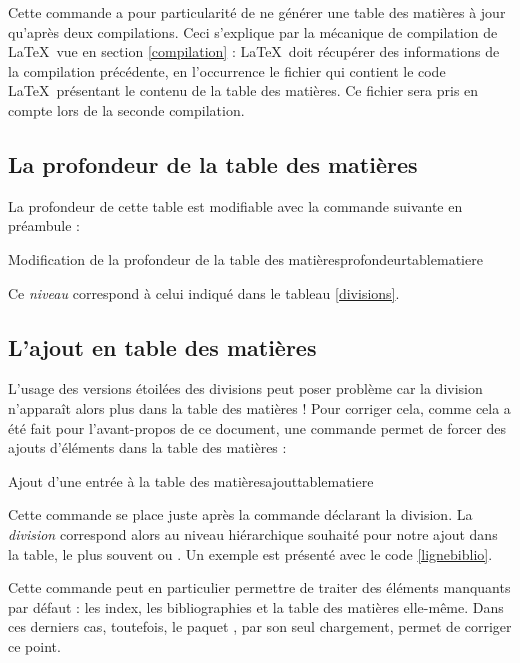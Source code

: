 Cette commande a pour particularité de ne générer une table des matières à jour qu'après deux compilations. Ceci s'explique par la mécanique de compilation de \LaTeX\ vue en section \ref{compilation} : \LaTeX\ doit récupérer des informations de la compilation précédente, en l'occurrence le fichier  qui contient le code \LaTeX\ présentant le contenu de la table des matières. Ce fichier sera pris en compte lors de la seconde compilation. 


\subsection{La profondeur de la table des matières}

La profondeur de cette table est modifiable avec la commande suivante en préambule :

\begin{codesimple}{Modification de la profondeur de la table des matières}{profondeurtablematiere}
\setcounter{tocdepth}{§oc£¤niveau§fc}
\end{codesimple}

Ce \textit{niveau} correspond à celui indiqué dans le tableau \ref{divisions}.


\subsection{L'ajout en table des matières} \label{tocajout}

L'usage des versions étoilées des divisions peut poser problème car la division n'apparaît alors plus dans la table des matières ! Pour corriger cela, comme cela a été fait pour l'avant-propos de ce document, une commande permet de forcer des ajouts d'éléments dans la table des matières :

\begin{codesimple}{Ajout d'une entrée à la table des matières}{ajouttablematiere}
\end{codesimple}

Cette commande se place juste après la commande déclarant la division. La \emph{division} correspond alors au niveau hiérarchique  souhaité pour notre ajout dans la table, le plus souvent  ou . Un exemple est présenté avec le code \ref{lignebiblio}.

Cette commande peut en particulier permettre de traiter des éléments manquants par défaut : les index, les bibliographies et la table des matières elle-même. Dans ces derniers cas, toutefois, le paquet , par son seul chargement, permet de corriger ce point.

